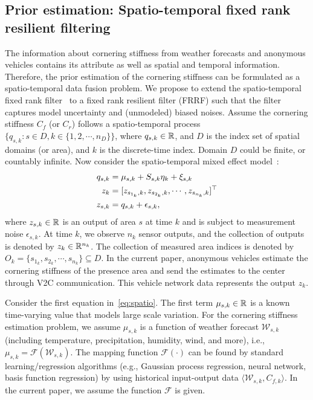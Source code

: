 \documentclass[letterpaper, 10 pt, conference]{ieeeconf}
\begin{document}
\subsection{Prior estimation: Spatio-temporal fixed rank resilient filtering}\label{sec:prior}

The information about cornering stiffness from weather forecasts and anonymous vehicles contains its attribute as well as spatial and temporal information. Therefore, the prior estimation of the cornering stiffness can be formulated as a spatio-temporal data fusion problem.
We propose to extend the spatio-temporal fixed rank filter~\cite{cressie2010fixed} to a fixed rank resilient filter (FRRF) such that the filter captures model uncertainty and (unmodeled) biased noises.
Assume the cornering stiffness $C_f$ (or $C_r$) follows a spatio-temporal process $\{q_{s,k}: s \in D, k \in \{1,2,\cdots, n_D\}\}$, where $q_{s,k} \in \mathbb{R}$, and $D$ is the index set of spatial domains (or area), and $k$ is the discrete-time index.
Domain $D$ could be finite, or countably infinite.
Now consider the spatio-temporal mixed effect model~\cite{cressie2010fixed,nguyen2014spatio}:
\begin{align}
    q_{s,k} &= \mu_{s,k} + S_{s,k}\eta_k + \xi_{s,k}\nonumber\\
    z_{k} & = [z_{s_{1_k},k},z_{s_{2_k},k},\cdots,z_{s_{{n_k}},k}]^\top\nonumber\\
    z_{s,k} &= q_{s,k} + \epsilon_{s,k},
    \label{eq:spatio}
\end{align}
where $z_{s,k} \in \mathbb{R}$ is an output of area $s$ at time $k$ and is subject to measurement noise $\epsilon_{s,k}$.
At time $k$, we observe $n_k$ sensor outputs, and
the collection of outputs is denoted by $z_{k} \in \mathbb{R}^{n_k}$. The collection of measured area indices is denoted by $O_k = \{s_{1_k},s_{2_k},\cdots,s_{n_k}\} \subseteq D$.
In the current paper, anonymous vehicles estimate the cornering stiffness of the presence area and send the estimates to the center through V2C communication. This vehicle network data represents the output $z_{k}$.

Consider the first equation in~\eqref{eq:spatio}. The first term $\mu_{s,k} \in \mathbb{R}$ is a known time-varying value that models large scale variation.
For the cornering stiffness estimation problem, we assume $\mu_{s,k}$ is a function of weather forecast ${\mathcal{W}}_{s,k}$ (including temperature, precipitation, humidity, wind, and more), i.e., $\mu_{s,k}={\mathcal{F}}({\mathcal{W}_{s,k}})$. The mapping function ${\mathcal{F}}(\cdot)$ can be found by standard learning/regression algorithms (e.g., Gaussian process regression, neural network, basis function regression) by using historical input-output data $\langle \mathcal{W}_{s,k}, C_{f,k}\rangle$.
In the current paper, we assume the function ${\mathcal{F}}$ is given.
\end{document}
